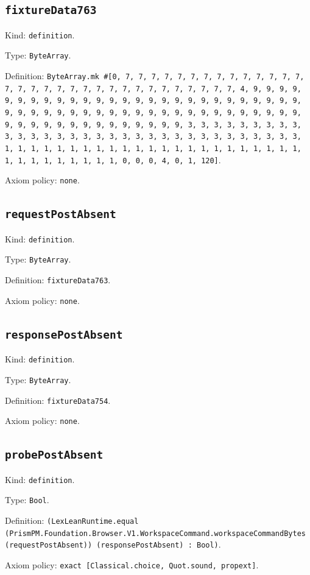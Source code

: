 \documentclass[11pt]{article}
\begin{document}
\subsection*{\texttt{fixtureData763}}
\noindent Kind: \texttt{definition}.\par
\noindent Type: \texttt{ByteArray}.\par
\noindent Definition: \texttt{ByteArray.mk \#[0, 7, 7, 7, 7, 7, 7, 7, 7, 7, 7, 7, 7, 7, 7, 7, 7, 7, 7, 7, 7, 7, 7, 7, 7, 7, 7, 7, 7, 7, 7, 7, 7, 4, 9, 9, 9, 9, 9, 9, 9, 9, 9, 9, 9, 9, 9, 9, 9, 9, 9, 9, 9, 9, 9, 9, 9, 9, 9, 9, 9, 9, 9, 9, 9, 9, 9, 9, 9, 9, 9, 9, 9, 9, 9, 9, 9, 9, 9, 9, 9, 9, 9, 9, 9, 9, 9, 9, 9, 9, 9, 9, 9, 9, 9, 9, 9, 9, 3, 3, 3, 3, 3, 3, 3, 3, 3, 3, 3, 3, 3, 3, 3, 3, 3, 3, 3, 3, 3, 3, 3, 3, 3, 3, 3, 3, 3, 3, 3, 3, 1, 1, 1, 1, 1, 1, 1, 1, 1, 1, 1, 1, 1, 1, 1, 1, 1, 1, 1, 1, 1, 1, 1, 1, 1, 1, 1, 1, 1, 1, 1, 1, 0, 0, 0, 4, 0, 1, 120]}.\par
\noindent Axiom policy: \texttt{none}.\par
\subsection*{\texttt{requestPostAbsent}}
\noindent Kind: \texttt{definition}.\par
\noindent Type: \texttt{ByteArray}.\par
\noindent Definition: \texttt{fixtureData763}.\par
\noindent Axiom policy: \texttt{none}.\par
\subsection*{\texttt{responsePostAbsent}}
\noindent Kind: \texttt{definition}.\par
\noindent Type: \texttt{ByteArray}.\par
\noindent Definition: \texttt{fixtureData754}.\par
\noindent Axiom policy: \texttt{none}.\par
\subsection*{\texttt{probePostAbsent}}
\noindent Kind: \texttt{definition}.\par
\noindent Type: \texttt{Bool}.\par
\noindent Definition: \texttt{(LexLeanRuntime.equal (PrismPM.Foundation.Browser.V1.WorkspaceCommand.workspaceCommandBytes (requestPostAbsent)) (responsePostAbsent) : Bool)}.\par
\noindent Axiom policy: \texttt{exact [Classical.choice, Quot.sound, propext]}.\par
\end{document}
